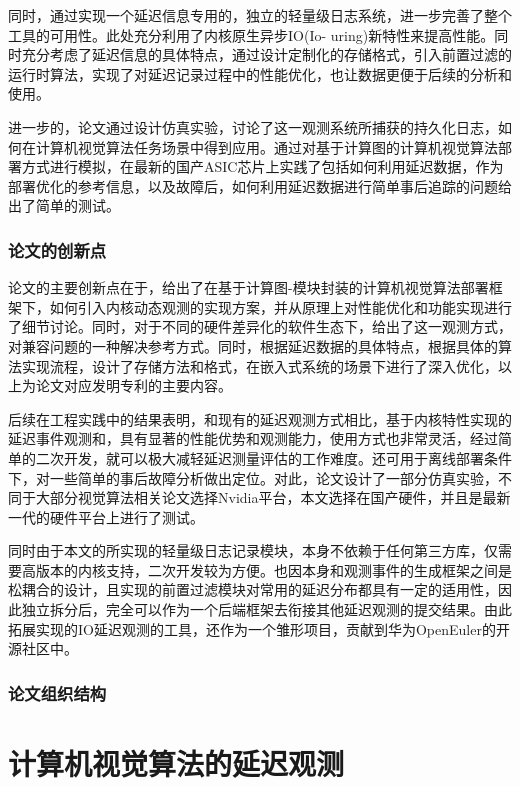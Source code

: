 \documentclass[master]{shtthesis}
\begin{document}
同时，通过实现一个延迟信息专用的，独立的轻量级日志系统，进一步完善了整个工具的可用性。此处充分利用了内核原生异步IO(Io- uring)\cite{axboe2019efficient}新特性来提高性能。同时充分考虑了延迟信息的具体特点，通过设计定制化的存储格式，引入前置过滤的运行时算法，实现了对延迟记录过程中的性能优化，也让数据更便于后续的分析和使用。

进一步的，论文通过设计仿真实验，讨论了这一观测系统所捕获的持久化日志，如何在计算机视觉算法任务场景中得到应用。通过对基于计算图的计算机视觉算法部署方式进行模拟，在最新的国产ASIC芯片上实践了包括如何利用延迟数据，作为部署优化的参考信息，以及故障后，如何利用延迟数据进行简单事后追踪的问题给出了简单的测试。

\subsection{论文的创新点}\label{论文的创新点}
论文的主要创新点在于，给出了在基于计算图-模块封装的计算机视觉算法部署框架下，如何引入内核动态观测的实现方案，并从原理上对性能优化和功能实现进行了细节讨论。同时，对于不同的硬件差异化的软件生态下，给出了这一观测方式，对兼容问题的一种解决参考方式。同时，根据延迟数据的具体特点，根据具体的算法实现流程，设计了存储方法和格式，在嵌入式系统的场景下进行了深入优化，以上为论文对应发明专利的主要内容\cite{patent}。

后续在工程实践中的结果表明，和现有的延迟观测方式相比，基于内核特性实现的延迟事件观测和，具有显著的性能优势和观测能力，使用方式也非常灵活，经过简单的二次开发，就可以极大减轻延迟测量评估的工作难度。还可用于离线部署条件下，对一些简单的事后故障分析做出定位。对此，论文设计了一部分仿真实验，不同于大部分视觉算法相关论文选择Nvidia平台，本文选择在国产硬件，并且是最新一代的硬件平台上进行了测试。

同时由于本文的所实现的轻量级日志记录模块，本身不依赖于任何第三方库，仅需要高版本的内核支持，二次开发较为方便。也因本身和观测事件的生成框架之间是松耦合的设计，且实现的前置过滤模块对常用的延迟分布都具有一定的适用性，因此独立拆分后，完全可以作为一个后端框架去衔接其他延迟观测的提交结果。由此拓展实现的IO延迟观测的工具，还作为一个雏形项目，贡献到华为OpenEuler的开源社区中\cite{stortrace}。

\subsection{论文组织结构}\label{论文组织结构}

\chapter{计算机视觉算法的延迟观测}
\end{document}
